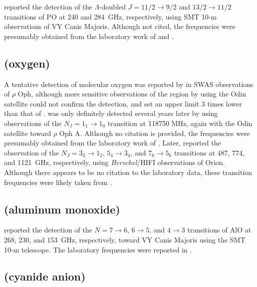 \documentclass[twocolumn]{aastex631}
\begin{document}
    \citet{Tenenbaum:2007po} reported the detection of the $\Lambda$-doubled $J = 11/2\rightarrow9/2$ and $13/2\rightarrow11/2$ transitions of PO at 240 and 284~GHz, respectively, using SMT 10-m observations of VY Canis Majoris.  Although not cited, the frequencies were presumably obtained from the laboratory work of \citet{Kawaguchi:1983co} and \citet{Bailleux:2002hl}.
    
    \subsection{ (oxygen)}
    \label{O2}
    
    A tentative detection of molecular oxygen was reported by \citet{Goldsmith:2002vy} in SWAS observations of $\rho$ Oph, although more sensitive observations of the region by \citet{Pagani:2003ku} using the Odin satellite could not confirm the detection, and set an upper limit 3 times lower than that of \citet{Goldsmith:2002vy}.   was only definitely detected several years later by \citet{Larsson:2007dx} using observations of the $N_J = 1_1\rightarrow1_0$ transition at 118750 MHz, again with the Odin satellite toward $\rho$ Oph A.  Although no citation is provided, the frequencies were presumably obtained from the laboratory work of \citet{Endo:1982hj}.  Later, \citet{Goldsmith:2011dj} reported the observation of the $N_J = 3_3\rightarrow1_2$, $5_4\rightarrow3_4$, and $7_6\rightarrow5_6$ transitions at 487, 774, and 1121~GHz, respectively, using \emph{Herschel}/HIFI observations of Orion.  Although there appears to be no citation to the laboratory data, these transition frequencies were likely taken from \citet{Drouin:2010fz}.    
    
    \subsection{ (aluminum monoxide)}
    \label{AlO}
    
    \citet{Tenenbaum:2009ba} reported the detection of the $N = 7\rightarrow6$, $6\rightarrow5$, and $4\rightarrow3$ transitions of AlO at 268, 230, and 153~GHz, respectively, toward VY Canis Majoris using the SMT 10-m telescope.  The laboratory frequencies were reported in \citet{Yamada:1990gz}.
    
    \subsection{ (cyanide anion)}
    \label{CN-}
    
\end{document}
